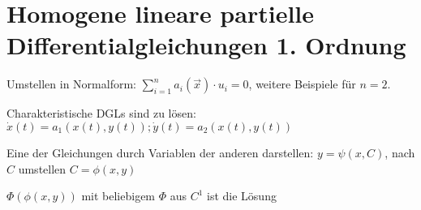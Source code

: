 \documentclass[10pt,a4paper]{article}
\newenvironment{packed_enum}{
\begin{enumerate}
  \setlength{\itemsep}{1pt}
  \setlength{\parskip}{0pt}
  \setlength{\parsep}{0pt}
}{\end{enumerate}}
\begin{document}
\section{Homogene lineare partielle Differentialgleichungen 1. Ordnung}
\begin{packed_enum}
\item Umstellen in Normalform: $\sum\limits_{i = 1}^n a_i(\vec{x}) \cdot u_i = 0$, weitere Beispiele für $n=2$.
\item Charakteristische DGLs sind zu lösen: $\dot{x}(t) = a_1(x(t), y(t)); \dot{y}(t) = a_2(x(t), y(t))$
\item Eine der Gleichungen durch Variablen der anderen darstellen: $y = \psi(x, C)$, nach $C$ umstellen $C = \phi(x,y)$
\item $\Phi(\phi(x,y))$ mit beliebigem $\Phi$ aus $C^1$ ist die Lösung
\end{packed_enum}
\end{document}
